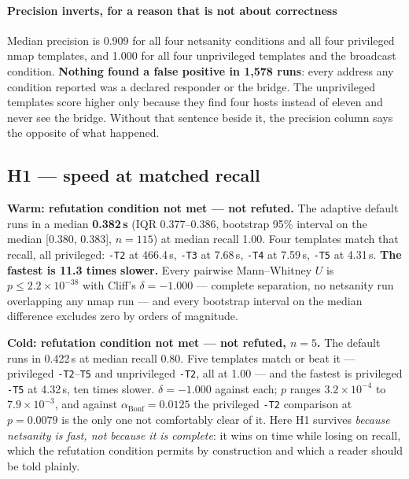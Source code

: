 \documentclass[conference]{IEEEtran}
\newcommand{\netsanity}{\textsf{netsanity}}
\newcommand{\NotRefuted}{not refuted}
\begin{document}
\paragraph*{Precision inverts, for a reason that is not about correctness}
\label{sec:precision}
Median precision is 0.909 for all four \netsanity{} conditions and all four
privileged nmap templates, and 1.000 for all four unprivileged templates and
the broadcast condition. \textbf{Nothing found a false positive in 1{,}578
runs}: every address any condition reported was a declared responder or the
bridge. The unprivileged templates score higher only because they find four
hosts instead of eleven and never see the bridge. Without that sentence beside
it, the precision column says the opposite of what happened.

\begin{table}[tb]
\caption{Median time to complete, with the interquartile range, and median
per-block recall, by cache arm. \emph{Read the cold column with its $n$:} one
flush per block gives each condition five to fifteen cold runs in 120 blocks.}
\label{tab:conditions_summary}
\centering

\end{table}

\subsection{H1 --- speed at matched recall}
\label{sec:h1}

\textbf{Warm: refutation condition not met --- \NotRefuted{}.} The adaptive
default runs in a median \textbf{0.382\,s} (IQR 0.377--0.386, bootstrap 95\%
interval on the median [0.380, 0.383], $n=115$) at median recall 1.00. Four
templates match that recall, all privileged: \texttt{-T2} at 466.4\,s,
\texttt{-T3} at 7.68\,s, \texttt{-T4} at 7.59\,s, \texttt{-T5} at 4.31\,s.
\textbf{The fastest is 11.3 times slower.} Every pairwise Mann--Whitney $U$ is
$p\le2.2\times10^{-38}$ with Cliff's $\delta=-1.000$ --- complete separation,
no \netsanity{} run overlapping any nmap run --- and every bootstrap interval
on the median difference excludes zero by orders of magnitude.

\textbf{Cold: refutation condition not met --- \NotRefuted{}, $n=5$.} The
default runs in 0.422\,s at median recall 0.80. Five templates match or beat it
--- privileged \texttt{-T2}--\texttt{T5} and unprivileged \texttt{-T2}, all at
1.00 --- and the fastest is privileged \texttt{-T5} at 4.32\,s, ten times
slower. $\delta=-1.000$ against each; $p$ ranges $3.2\times10^{-4}$ to
$7.9\times10^{-3}$, and against $\alpha_{\mathrm{Bonf}}=0.0125$ the privileged
\texttt{-T2} comparison at $p=0.0079$ is the only one not comfortably clear of
it. Here H1 survives \emph{because \netsanity{} is fast, not because it is
complete}: it wins on time while losing on recall, which the refutation
condition permits by construction and which a reader should be told plainly.
\end{document}
